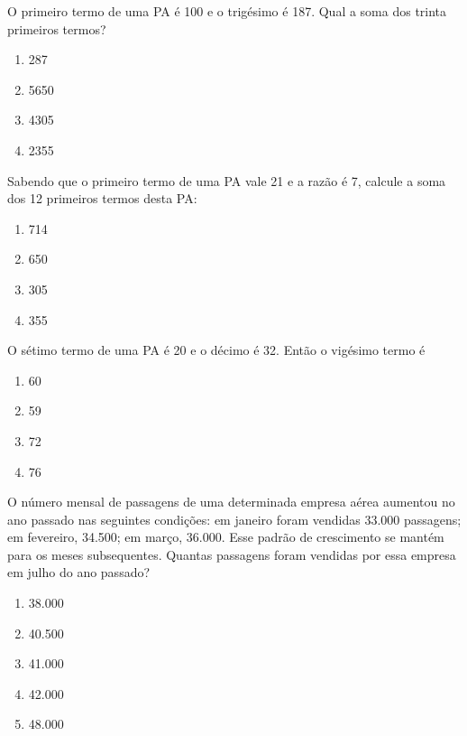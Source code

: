 		\item O primeiro termo de uma PA é 100 e o trigésimo é 187. Qual a soma dos trinta primeiros termos? 
		\begin{multicols}{4}
		\begin{enumerate}
			\item 287
			\item 5650
			\item 4305 
			\item 2355   
		\end{enumerate} 
		\end{multicols}
		
		\item Sabendo que o primeiro termo de uma PA vale 21 e a razão é 7, calcule a soma dos 12 primeiros termos desta PA: 
		\begin{multicols}{4}
		\begin{enumerate}
			\item 714
			\item 650
			\item 305 
			\item 355 
		\end{enumerate} 
		\end{multicols}
		
		\item O sétimo termo de uma PA é 20 e o décimo é 32. Então o vigésimo termo é 
		\begin{multicols}{4}
		\begin{enumerate}
			\item 60
			\item 59
			\item 72 
			\item 76 
		\end{enumerate} 
		\end{multicols}
		
		\item O número mensal de passagens de uma determinada empresa aérea aumentou no ano passado nas seguintes condições: em janeiro foram vendidas 33.000 passagens; em fevereiro, 34.500; em março, 36.000. Esse padrão de crescimento se mantém para os meses subsequentes. Quantas passagens foram vendidas por essa empresa em julho do ano passado?
		\begin{multicols}{5}
		\begin{enumerate}
			\item 38.000
			\item 40.500
			\item 41.000 
			\item 42.000
			\item 48.000 
		\end{enumerate} 
		\end{multicols}

